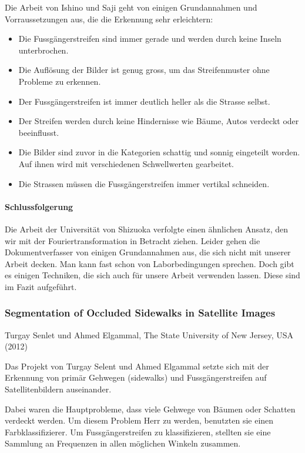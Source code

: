 Die Arbeit von Ishino und Saji geht von einigen Grundannahmen und Vorraussetzungen aus, die die Erkennung sehr erleichtern:

\begin{itemize}
	\item Die Fussgängerstreifen sind immer gerade und werden durch keine Inseln unterbrochen.
	\item Die Auflösung der Bilder ist genug gross, um das Streifenmuster ohne Probleme zu erkennen.
	\item Der Fussgängerstreifen ist immer deutlich heller als die Strasse selbst.
	\item Der Streifen werden durch keine Hindernisse wie Bäume, Autos verdeckt oder beeinflusst.
	\item Die Bilder sind zuvor in die Kategorien schattig und sonnig eingeteilt worden. Auf ihnen wird mit verschiedenen Schwellwerten gearbeitet.
	\item Die Strassen müssen die Fussgängerstreifen immer vertikal schneiden.
\end{itemize}

\paragraph{Schlussfolgerung}
Die Arbeit der Universität von Shizuoka verfolgte einen ähnlichen Ansatz, den wir mit der Fouriertransformation in Betracht ziehen. Leider gehen die Dokumentverfasser von einigen Grundannahmen aus, die sich nicht mit unserer Arbeit decken. Man kann fast schon von Laborbedingungen sprechen.
Doch gibt es einigen Techniken, die sich auch für unsere Arbeit verwenden lassen. Diese sind im Fazit aufgeführt.

\subsubsection{Segmentation of Occluded Sidewalks in Satellite Images}
Turgay Senlet und Ahmed Elgammal, The State University of New Jersey, USA (2012)\cite{senlet2012segmentation} \newline

Das Projekt von Turgay Selent und Ahmed Elgammal setzte sich mit der Erkennung von primär Gehwegen (sidewalks) und Fussgängerstreifen auf Satellitenbildern auseinander.

Dabei waren die Hauptprobleme, dass viele Gehwege von Bäumen oder Schatten verdeckt werden. Um diesem Problem Herr zu werden, benutzten sie einen Farbklassifizierer.
Um Fussgängerstreifen zu klassifizieren, stellten sie eine Sammlung an Frequenzen in allen möglichen Winkeln zusammen. 

